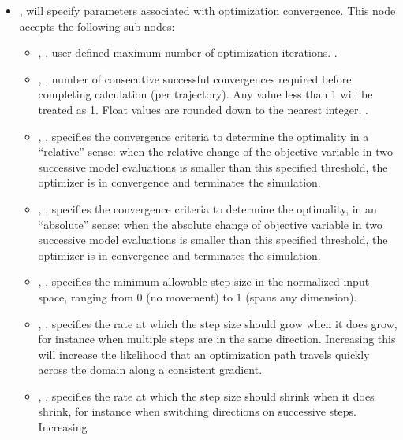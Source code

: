 \begin{itemize}
\item {},  will specify parameters associated with optimization
convergence. This node accepts the following sub-nodes:
  \begin{itemize}
  \item {}, , user-defined maximum number of optimization iterations. .
  \item {}, , number of consecutive successful
    convergences required before completing calculation (per trajectory). Any value less than 1 will be
    treated as 1.  Float values are rounded down to the nearest integer. .
  \item {}, , specifies the convergence criteria to determine the optimality
  in a ``relative'' sense: when the relative change of the objective variable in two successive model evaluations is smaller than
  this specified threshold, the  optimizer is in convergence and terminates the simulation.
  \item {}, , specifies the convergence criteria to determine the optimality,
  in an ``absolute'' sense: when the absolute change of objective variable in two successive model evaluations is smaller
  than this specified threshold, the  optimizer is in convergence and terminates the simulation.
  \item {}, , specifies the minimum allowable step size in
    the normalized input space, ranging from 0 (no movement) to 1 (spans any dimension).
  \item {}, , specifies the rate at which the step size
    should grow when it does grow, for instance when multiple steps are in the same direction.  Increasing
    this will increase the likelihood that an optimization path travels quickly across the domain along a
    consistent gradient.
  \item {}, , specifies the rate at which the step size
    should shrink when it does shrink, for instance when switching directions on successive steps.  Increasing

\end{itemize}
\end{itemize}
